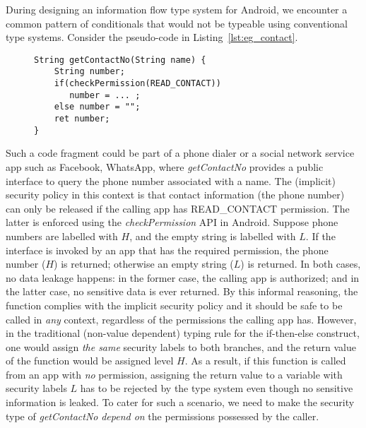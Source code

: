 During designing an information flow type system for Android, we encounter
a common pattern of conditionals that would not be typeable using conventional type systems.
Consider the pseudo-code in Listing~\ref{lst:eg_contact}.
\begin{figure}[ht]
\begin{lstlisting}[caption={Sample code for getting contact info with a permission check.}, label={lst:eg_contact}]
String getContactNo(String name) {
    String number;
    if(checkPermission(READ_CONTACT))
       number = ... ;
    else number = "";
    ret number;
}
\end{lstlisting}
\end{figure}
Such a code fragment could be part of a phone dialer or a social network service app such as Facebook, WhatsApp, where \textit{getContactNo} provides
a public interface to query the phone number associated with a name. The (implicit) security policy in this
context is that contact information (the phone number) can only be released if the calling app has
READ\_CONTACT permission.
The latter is enforced using the \textit{checkPermission} API in Android.
Suppose phone numbers are labelled with $H$, and the empty string is labelled with $L$.
If the interface is invoked by an app that has the required permission,
the phone number ($H$) is returned; otherwise an empty string ($L$)
is returned. In both cases, no data leakage happens: in the former case, the calling app is authorized; and in the latter case, no sensitive data is ever returned. By this informal reasoning, the function complies with the implicit security policy and it
should be safe to be called in \emph{any} context, regardless of the permissions the calling app has.
However, in the traditional (non-value dependent) typing rule for the if-then-else construct, one would assign \emph{the same} security labels to both branches,
and the return value of the function would be assigned level $H$.
As a result, if this function is called from an app with \emph{no} permission, assigning the return value to a variable with security labels $L$ has to be rejected by the type system even though no sensitive information is leaked.
To cater for such a scenario, we need to make the security type of \textit{getContactNo}
 \emph{depend on} the permissions possessed by the caller.


